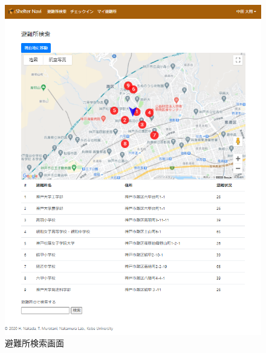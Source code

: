 \documentclass[technicalreport,dvipdfmx]{ieicej}
\begin{document}
\begin{figure}[htbp]
     \begin{center}
          \includegraphics[scale=0.6,pagebox=cropbox,clip]{img/search_shelter.png}
          \caption{避難所検索画面}
          \label{fig:search_shelter}
     \end{center}
\end{figure}
\end{document}
